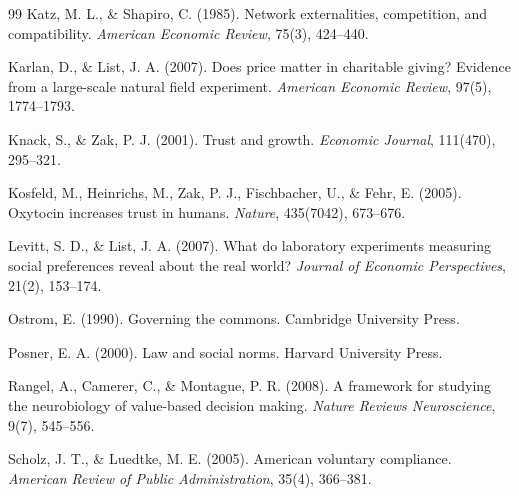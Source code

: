 \documentclass[12pt,oneside]{book}
\begin{document}
\begin{thebibliography}{99}
  Katz, M. L., \& Shapiro, C. (1985). Network externalities, competition, and compatibility.
  \textit{American Economic Review}, 75(3), 424--440.

  Karlan, D., \& List, J. A. (2007). Does price matter in charitable giving? Evidence from a large-scale
  natural field experiment.
  \textit{American Economic Review}, 97(5), 1774--1793.

  Knack, S., \& Zak, P. J. (2001). Trust and growth.
  \textit{Economic Journal}, 111(470), 295--321.

  Kosfeld, M., Heinrichs, M., Zak, P. J., Fischbacher, U., \& Fehr, E. (2005). Oxytocin increases trust
  in humans.
  \textit{Nature}, 435(7042), 673--676.

  Levitt, S. D., \& List, J. A. (2007). What do laboratory experiments measuring social preferences reveal
  about the real world?
  \textit{Journal of Economic Perspectives}, 21(2), 153--174.

  Ostrom, E. (1990). Governing the commons.
  Cambridge University Press.

  Posner, E. A. (2000). Law and social norms.
  Harvard University Press.

  Rangel, A., Camerer, C., \& Montague, P. R. (2008). A framework for studying the neurobiology of value-based
  decision making.
  \textit{Nature Reviews Neuroscience}, 9(7), 545--556.

  Scholz, J. T., \& Luedtke, M. E. (2005). American voluntary compliance.
  \textit{American Review of Public Administration}, 35(4), 366--381.

\end{thebibliography}

\end{document}
